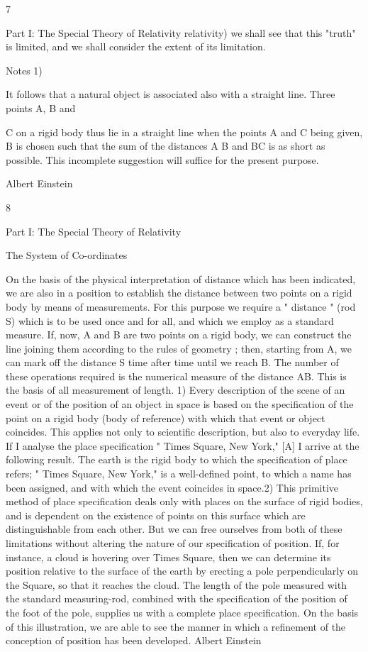 \documentclass{article}
\begin{document}
7

Part I: The Special Theory of Relativity
relativity) we shall see that this "truth" is limited, and we shall consider the extent of its
limitation.

Notes
1)

It follows that a natural object is associated also with a straight line. Three points A, B and

C on a rigid body thus lie in a straight line when the points A and C being given, B is chosen
such that the sum of the distances A B and BC is as short as possible. This incomplete
suggestion will suffice for the present purpose.

Albert Einstein

8

Part I: The Special Theory of Relativity

The System of Co-ordinates

On the basis of the physical interpretation of distance which has been indicated, we are
also in a position to establish the distance between two points on a rigid body by means of
measurements. For this purpose we require a " distance " (rod S) which is to be used once
and for all, and which we employ as a standard measure. If, now, A and B are two points on
a rigid body, we can construct the line joining them according to the rules of geometry ;
then, starting from A, we can mark off the distance S time after time until we reach B. The
number of these operations required is the numerical measure of the distance AB. This is the
basis of all measurement of length. 1)
Every description of the scene of an event or of the position of an object in space is based
on the specification of the point on a rigid body (body of reference) with which that event or
object coincides. This applies not only to scientific description, but also to everyday life. If I
analyse the place specification " Times Square, New York," [A] I arrive at the following
result. The earth is the rigid body to which the specification of place refers; " Times Square,
New York," is a well-defined point, to which a name has been assigned, and with which the
event coincides in space.2)
This primitive method of place specification deals only with places on the surface of rigid
bodies, and is dependent on the existence of points on this surface which are distinguishable
from each other. But we can free ourselves from both of these limitations without altering
the nature of our specification of position. If, for instance, a cloud is hovering over Times
Square, then we can determine its position relative to the surface of the earth by erecting a
pole perpendicularly on the Square, so that it reaches the cloud. The length of the pole
measured with the standard measuring-rod, combined with the specification of the position
of the foot of the pole, supplies us with a complete place specification. On the basis of this
illustration, we are able to see the manner in which a refinement of the conception of
position has been developed.
Albert Einstein
\end{document}
